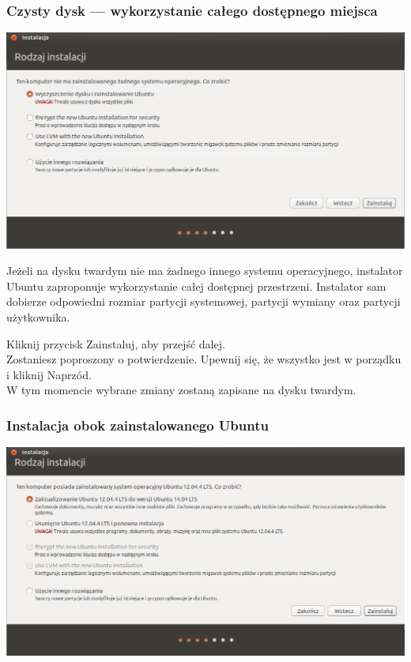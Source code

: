 \subsubsection{Czysty dysk --- wykorzystanie całego dostępnego miejsca}
\begin{center}
        \includegraphics[width=\linewidth]{images/instalator_partycjonowanie_proste.png}
\end{center}

Jeżeli na dysku twardym nie ma żadnego innego systemu operacyjnego, instalator Ubuntu zaproponuje wykorzystanie całej dostępnej przestrzeni. Instalator sam dobierze odpowiedni rozmiar partycji systemowej, partycji wymiany oraz partycji użytkownika.
\begin{flushright}
Kliknij przycisk \textcolor{ubuntu_orange}{Zainstaluj}, aby przejść dalej.\\
Zostaniesz poproszony o potwierdzenie. Upewnij się, że wszystko jest w porządku i kliknij \textcolor{ubuntu_orange}{Naprzód}.\\
W tym momencie wybrane zmiany zostaną zapisane na dysku twardym.
\end{flushright}
\clearpage
\subsubsection{Instalacja obok zainstalowanego Ubuntu}
\begin{center}
        \includegraphics[width=\linewidth]{images/instalator_partycjonowanie_obok_ubuntu.png}
\end{center}

